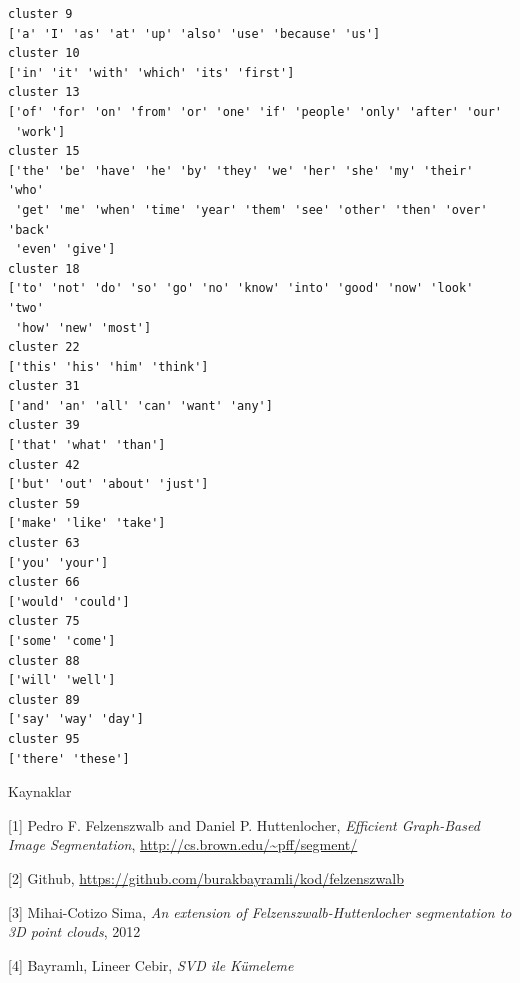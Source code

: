 \documentclass[12pt,fleqn]{article}\usepackage{../../common}
\begin{document}
\begin{verbatim}
cluster 9
['a' 'I' 'as' 'at' 'up' 'also' 'use' 'because' 'us']
cluster 10
['in' 'it' 'with' 'which' 'its' 'first']
cluster 13
['of' 'for' 'on' 'from' 'or' 'one' 'if' 'people' 'only' 'after' 'our'
 'work']
cluster 15
['the' 'be' 'have' 'he' 'by' 'they' 'we' 'her' 'she' 'my' 'their' 'who'
 'get' 'me' 'when' 'time' 'year' 'them' 'see' 'other' 'then' 'over' 'back'
 'even' 'give']
cluster 18
['to' 'not' 'do' 'so' 'go' 'no' 'know' 'into' 'good' 'now' 'look' 'two'
 'how' 'new' 'most']
cluster 22
['this' 'his' 'him' 'think']
cluster 31
['and' 'an' 'all' 'can' 'want' 'any']
cluster 39
['that' 'what' 'than']
cluster 42
['but' 'out' 'about' 'just']
cluster 59
['make' 'like' 'take']
cluster 63
['you' 'your']
cluster 66
['would' 'could']
cluster 75
['some' 'come']
cluster 88
['will' 'well']
cluster 89
['say' 'way' 'day']
cluster 95
['there' 'these']
\end{verbatim}

Kaynaklar

[1] Pedro F. Felzenszwalb and Daniel P. Huttenlocher, {\em Efficient
  Graph-Based Image Segmentation}, \url{http://cs.brown.edu/~pff/segment/}

[2] Github, \url{https://github.com/burakbayramli/kod/felzenszwalb}

[3] Mihai-Cotizo Sima, {\em An extension of Felzenszwalb-Huttenlocher
  segmentation to 3D point clouds}, 2012

[4] Bayramlı, Lineer Cebir, {\em SVD ile Kümeleme}
\end{document}
